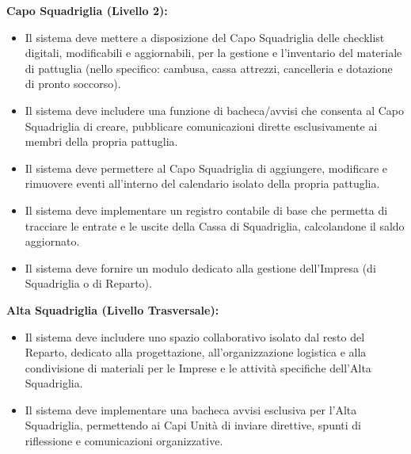 \documentclass[11pt]{article}
\numberwithin{figure}{section}
\begin{document}
\textbf{Capo Squadriglia (Livello 2):}
\begin{itemize}[topsep=0pt]
    \item Il sistema deve mettere a disposizione del Capo Squadriglia delle checklist digitali, modificabili e aggiornabili, per la gestione e l'inventario del materiale di pattuglia (nello specifico: cambusa, cassa attrezzi, cancelleria e dotazione di pronto soccorso).
    \item Il sistema deve includere una funzione di bacheca/avvisi che consenta al Capo Squadriglia di creare, pubblicare comunicazioni dirette esclusivamente ai membri della propria pattuglia.
    \item Il sistema deve permettere al Capo Squadriglia di aggiungere, modificare e rimuovere eventi all'interno del calendario isolato della propria pattuglia.
    \item Il sistema deve implementare un registro contabile di base che permetta di tracciare le entrate e le uscite della Cassa di Squadriglia, calcolandone il saldo aggiornato.
    \item Il sistema deve fornire un modulo dedicato alla gestione dell'Impresa (di Squadriglia o di Reparto).
\end{itemize}

\vspace{1cm}

\textbf{Alta Squadriglia (Livello Trasversale):}
\begin{itemize}
    \item Il sistema deve includere uno spazio collaborativo isolato dal resto del Reparto, dedicato alla progettazione, all'organizzazione logistica e alla condivisione di materiali per le Imprese e le attività specifiche dell'Alta Squadriglia.
    \item Il sistema deve implementare una bacheca avvisi esclusiva per l'Alta Squadriglia, permettendo ai Capi Unità di inviare direttive, spunti di riflessione e comunicazioni organizzative.
\end{itemize}
\end{document}
